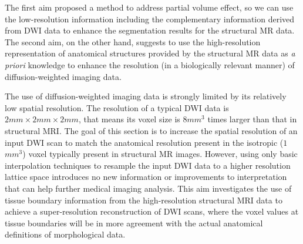 The first aim proposed a method to address partial volume effect, so we can use the low-resolution information including the complementary information derived from DWI data to enhance the segmentation results for the structural MR data.
The second aim, on the other hand, suggests to use the high-resolution representation of anatomical structures provided by the structural MR data as \emph{a priori} knowledge to enhance the resolution (in a biologically relevant manner) of diffusion-weighted imaging data.

The use of diffusion-weighted imaging data is strongly limited by its relatively low spatial resolution. The resolution of a typical DWI data is $2mm \times 2mm \times 2mm$, that means its voxel size is $8 mm^{3}$ times larger than that in structural MRI.
The goal of this section is to increase the spatial resolution of an input DWI scan to match the anatomical resolution present in the isotropic ($1$ $mm^3$) voxel typically present in structural MR images. However, using only basic interpolation techniques to resample the input DWI data to a higher resolution lattice space introduces no new information or improvements to interpretation that can help further medical imaging analysis. This aim investigates the use of tissue boundary information from the high-resolution structural MRI data to achieve a super-resolution reconstruction of DWI scans, where the voxel values at tissue boundaries will be in more agreement with the actual anatomical definitions of morphological data.
\newline